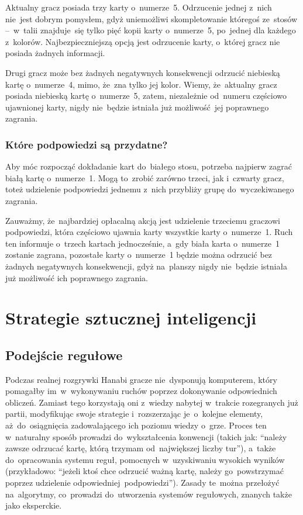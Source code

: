 \documentclass[declaration,shortabstract,inz]{iithesis}
\begin{document}
Aktualny gracz posiada trzy karty o~numerze~5. Odrzucenie jednej z~nich nie~jest dobrym pomysłem, gdyż uniemożliwi skompletowanie któregoś ze~stosów --~w~talii znajduje~się tylko pięć kopii karty o~numerze~5, po~jednej dla każdego z~kolorów. Najbezpieczniejszą opcją jest odrzucenie karty, o~której gracz nie posiada żadnych informacji.

Drugi gracz może bez żadnych negatywnych konsekwencji odrzucić niebieską kartę o~numerze~4, mimo, że~zna tylko jej kolor. Wiemy, że~aktualny gracz posiada niebieską kartę o~numerze~5, zatem, niezależnie od~numeru częściowo ujawnionej karty, nigdy nie~będzie istniała już możliwość jej poprawnego zagrania.

\subsection*{Które podpowiedzi są przydatne?}

Aby móc rozpocząć dokładanie kart do~białego stosu, potrzeba najpierw zagrać białą kartę o~numerze~1. Mogą to~zrobić zarówno trzeci, jak i~czwarty gracz, toteż udzielenie podpowiedzi jednemu z~nich przybliży grupę do~wyczekiwanego zagrania.

Zauważmy, że~najbardziej opłacalną akcją jest udzielenie trzeciemu graczowi podpowiedzi, która częściowo ujawnia karty wszystkie karty o~numerze~1. Ruch ten informuje o~trzech kartach jednocześnie, a~gdy biała karta o~numerze~1 zostanie zagrana, pozostałe karty o~numerze~1 będzie można odrzucić bez żadnych negatywnych konsekwencji, gdyż na~planszy nigdy nie~będzie istniała już możliwość ich poprawnego zagrania.

\chapter{Strategie sztucznej inteligencji}

\section{Podejście regułowe}

Podczas realnej rozgrywki Hanabi gracze nie~dysponują komputerem, który pomagałby im~w~wykonywaniu ruchów poprzez dokonywanie odpowiednich obliczeń. Zamiast tego korzystają oni z~wiedzy nabytej w~trakcie rozegranych już partii, modyfikując swoje strategie i~rozszerzając je~o~kolejne elementy, aż~do~osiągnięcia zadowalającego ich poziomu wiedzy o~grze. Proces ten w~naturalny sposób prowadzi do~wykształcenia konwencji (takich jak: ``należy zawsze odrzucać kartę, którą trzymam od~największej liczby tur''), a~także do~opracowania systemu reguł, pomocnych w~uzyskiwaniu wysokich wyników (przykładowo: ``jeżeli ktoś chce odrzucić ważną kartę, należy go~powstrzymać poprzez udzielenie odpowiedniej podpowiedzi''). Zasady te~można przełożyć na~algorytmy, co~prowadzi do~utworzenia systemów regułowych, znanych także jako eksperckie.
\end{document}

